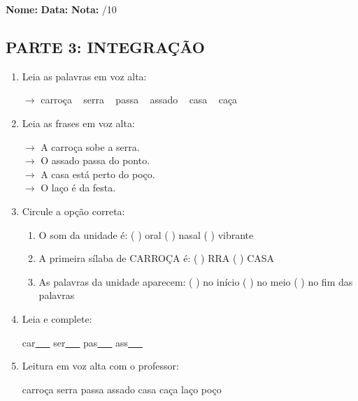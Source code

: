 \begin{exercicio}

\noindent\textbf{Nome:} \underline{\hspace{3.2cm}} \quad \textbf{Data:} \underline{\hspace{1.6cm}} \quad \textbf{Nota:} \underline{\hspace{0.9cm}}/10


\subsection*{PARTE 3: INTEGRAÇÃO}

\begin{enumerate}[resume]

  \item Leia as palavras em voz alta:
  \begin{center}
  $\rightarrow$ carroça ~ serra ~ passa ~ assado ~ casa ~ caça
  \end{center}

  \item Leia as frases em voz alta:
  \begin{center}
  $\rightarrow$ A carroça sobe a serra.\\
  $\rightarrow$ O assado passa do ponto.\\
  $\rightarrow$ A casa está perto do poço.\\
  $\rightarrow$ O laço é da festa.\\
  \end{center}

  \item Circule a opção correta:
  \begin{enumerate}[label=(\alph*)]

    \item O som da unidade é: ( ) oral ( ) nasal ( ) vibrante

    \item A primeira sílaba de CARROÇA é: ( ) RRA ( ) CASA

    \item As palavras da unidade aparecem: ( ) no início ( ) no meio ( ) no fim das palavras

  \end{enumerate}

  \item Leia e complete:
  \begin{center}
  car\underline{~~~} \quad ser\underline{~~~} \quad pas\underline{~~~} \quad ass\underline{~~~}
  \end{center}

  \item Leitura em voz alta com o professor:
  \begin{center}
  carroça \quad serra \quad passa \quad assado \quad casa \quad caça \quad laço \quad poço
  \end{center}

\end{enumerate}

\end{exercicio}

